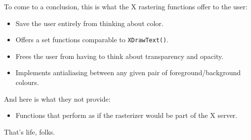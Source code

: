 To come to a conclusion, this is what the X rastering functions offer to the
user: 
\begin{itemize}
\item Save the user entirely from thinking about color.
\item Offers a set functions comparable to \verb+XDrawText()+.
\item Frees the user from having to think about transparency and opacity.
\item Implements antialiasing between any given pair of foreground/background
  colours.
\end{itemize}
And here is what they not provide:
\begin{itemize}
\item Functions that perform as if the rasterizer would be part of the X
  server.
\end{itemize}
That's life, folks.



